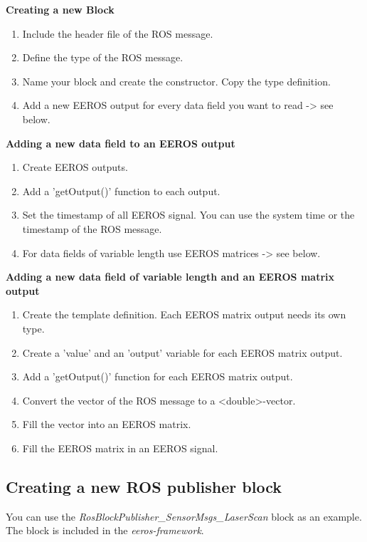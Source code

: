 \textbf{Creating a new Block}
\label{creatingANewBlock}
\begin{enumerate}[\hspace{0.5cm}{A}-1]
\item Include the header file of the ROS message.
\item Define the type of the ROS message.
\item Name your block and create the constructor. Copy the type definition.
\item Add a new EEROS output for every data field you want to read -> see below.
\end{enumerate}

\textbf{Adding a new data field to an EEROS output}
\begin{enumerate}[\hspace{0.5cm}{B}-1]
\item Create EEROS outputs.
\item Add a 'getOutput()' function to each output.
\item Set the timestamp of all EEROS signal. You can use the system time or the timestamp of the ROS message.
\item For data fields of variable length use EEROS matrices -> see below.
\end{enumerate}

\textbf{Adding a new data field of variable length and an EEROS matrix output}
\begin{enumerate}[\hspace{0.5cm}{C}-1]
\item Create the template definition. Each EEROS matrix output needs its own type.
\item Create a 'value' and an 'output' variable for each EEROS matrix output.
\item Add a 'getOutput()' function for each EEROS matrix output.
\item Convert the vector of the ROS message to a <double>-vector.
\item Fill the vector into an EEROS matrix.
\item Fill the EEROS matrix in an EEROS signal.
\end{enumerate}


\subsection{Creating a new ROS publisher block}
You can use the \textit{RosBlockPublisher\_SensorMsgs\_LaserScan} block as an example.
The block is included in the \textit{eeros-framework}.

